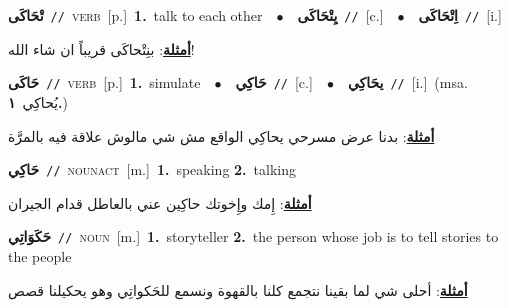 \documentclass[10pt,a4paper,twoside]{article} %
\begin{document}
\begin{multicols}{2}
{\setlength\topsep{0pt}\textbf{\foreignlanguage{arabic}{تْحَاكَى}}\ {\color{gray}\texttt{//}\color{black}}\ \textsc{verb}\ [p.]\ \textbf{1.}~talk to each other\ \ $\bullet$\ \ \setlength\topsep{0pt}\textbf{\foreignlanguage{arabic}{يِتْحَاكَى}}\ {\color{gray}\texttt{//}\color{black}}\ [c.]\ \ $\bullet$\ \ \setlength\topsep{0pt}\textbf{\foreignlanguage{arabic}{اِتْحَاكَى}}\ {\color{gray}\texttt{//}\color{black}}\ [i.]\  \begin{flushright}\color{gray}\foreignlanguage{arabic}{\textbf{\underline{\foreignlanguage{arabic}{أمثلة}}}: بنِتْحاكَى قريباً ان شاء الله!}\end{flushright}\color{black}} \vspace{2mm}

{\setlength\topsep{0pt}\textbf{\foreignlanguage{arabic}{حَاكَى}}\ {\color{gray}\texttt{//}\color{black}}\ \textsc{verb}\ [p.]\ \textbf{1.}~simulate\ \ $\bullet$\ \ \setlength\topsep{0pt}\textbf{\foreignlanguage{arabic}{حَاكِي}}\ {\color{gray}\texttt{//}\color{black}}\ [c.]\ \ $\bullet$\ \ \setlength\topsep{0pt}\textbf{\foreignlanguage{arabic}{يحَاكِي}}\ {\color{gray}\texttt{//}\color{black}}\ [i.]\ \color{gray}(msa. \foreignlanguage{arabic}{يُحاكِي}~\foreignlanguage{arabic}{\textbf{١.}})\color{black}\  \begin{flushright}\color{gray}\foreignlanguage{arabic}{\textbf{\underline{\foreignlanguage{arabic}{أمثلة}}}: بدنا عرض مسرحي يحاكِي الواقع مش شي مالوش علاقة فيه بالمرَّة}\end{flushright}\color{black}} \vspace{2mm}

{\setlength\topsep{0pt}\textbf{\foreignlanguage{arabic}{حَاكِي}}\ {\color{gray}\texttt{//}\color{black}}\ \textsc{noun\textunderscore act}\ [m.]\ \textbf{1.}~speaking  \textbf{2.}~talking\  \begin{flushright}\color{gray}\foreignlanguage{arabic}{\textbf{\underline{\foreignlanguage{arabic}{أمثلة}}}: إِمك وإِخوتك حاكِين عني بالعاطل قدام الجيران}\end{flushright}\color{black}} \vspace{2mm}

{\setlength\topsep{0pt}\textbf{\foreignlanguage{arabic}{حَكَوَاتِي}}\ {\color{gray}\texttt{//}\color{black}}\ \textsc{noun}\ [m.]\ \textbf{1.}~storyteller  \textbf{2.}~the person whose job is to tell stories to the people\  \begin{flushright}\color{gray}\foreignlanguage{arabic}{\textbf{\underline{\foreignlanguage{arabic}{أمثلة}}}: أحلى شي لما بقينا نتجمع كلنا بالقهوة ونسمع للحَكواتِي وهو يحكيلنا قصص}\end{flushright}\color{black}} \vspace{2mm}


\end{multicols}
\end{document}

